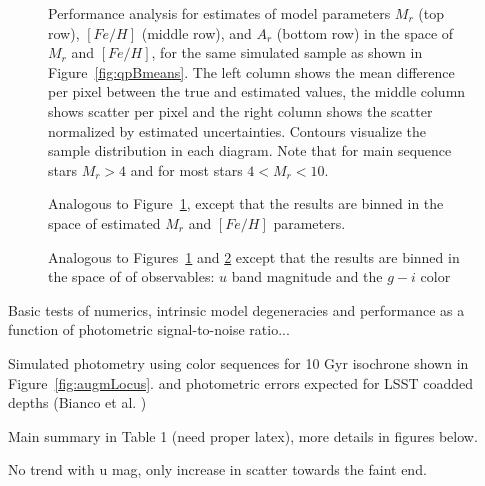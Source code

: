 \begin{figure}[ht!]
\caption{Performance analysis for estimates of model parameters $M_r$
  (top row),  $[Fe/H]$ (middle row), and $A_r$ (bottom row) in the
  space of $M_r$ and $[Fe/H]$, for the same simulated sample as shown
  in Figure~\ref{fig:qpBmeans}. 
  The left column shows the mean difference per pixel between the true
  and estimated values, the middle column shows scatter per pixel and
  the right column shows the scatter normalized by estimated
  uncertainties. Contours visualize the sample distribution in each
  diagram. Note that for main sequence stars $M_r>4$ and for most
  stars $4 < M_r < 10$. 
\label{fig:perfVStrueParams}}
\end{figure}


\begin{figure}[ht!]
\caption{Analogous to Figure~\ref{fig:perfVStrueParams}, except that
  the results are binned in the space of estimated $M_r$ and $[Fe/H]$ parameters.
\label{fig:perfVSestParams}}
\end{figure}
 



\begin{figure}[ht!]
\caption{Analogous to Figures~\ref{fig:perfVStrueParams} and \ref{fig:perfVSestParams}
except that the results are binned in the space of 
  of observables: $u$ band magnitude and the $g-i$ color
\label{fig:perfVScmd}}
\end{figure}





Basic tests of numerics, intrinsic model degeneracies and performance
as a function of photometric signal-to-noise ratio... 

Simulated photometry using color sequences for 10 Gyr isochrone shown in Figure~\ref{fig:augmLocus}. 
and photometric errors expected for LSST coadded depths (Bianco et al. )

Main summary in Table 1 (need proper latex), more details in figures below. 

No trend with u mag, only increase in scatter towards the faint end. 

